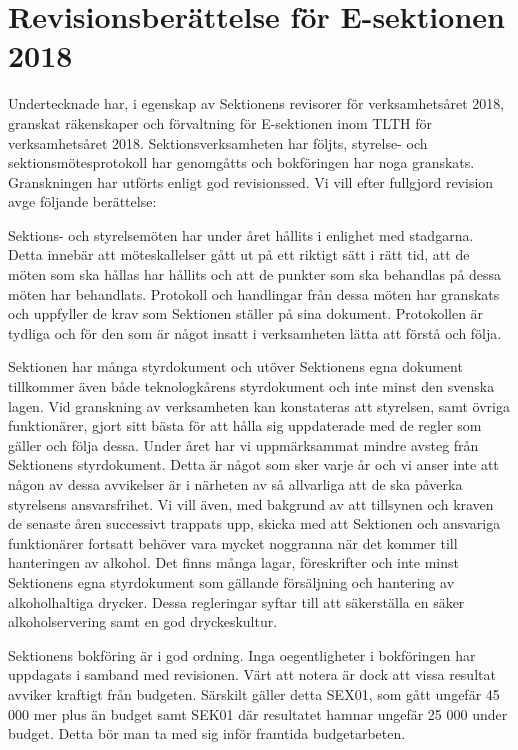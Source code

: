 \documentclass[../_main/handlingar.tex]{subfiles}
\begin{document}
\section{Revisionsberättelse för E-sektionen 2018}

Undertecknade har, i egenskap av Sektionens revisorer för verksamhetsåret 2018, granskat räkenskaper och förvaltning för E-sektionen inom TLTH för verksamhetsåret 2018. Sektionsverksamheten har följts, styrelse- och sektionsmötesprotokoll har genomgåtts och bokföringen har noga granskats. Granskningen har utförts enligt god revisionssed. Vi vill efter fullgjord revision avge följande berättelse: 

Sektions- och styrelsemöten har under året hållits i enlighet med stadgarna. Detta innebär att möteskallelser gått ut på ett riktigt sätt i rätt tid, att de möten som ska hållas har hållits och att de punkter som ska behandlas på dessa möten har behandlats. Protokoll och handlingar från dessa möten har granskats och uppfyller de krav som Sektionen ställer på sina dokument. Protokollen är tydliga och för den som är något insatt i verksamheten lätta att förstå och följa. 

Sektionen har många styrdokument och utöver Sektionens egna dokument tillkommer även både teknologkårens styrdokument och inte minst den svenska lagen. Vid granskning av verksamheten kan konstateras att styrelsen, samt övriga funktionärer, gjort sitt bästa för att hålla sig uppdaterade med de regler som gäller och följa dessa. Under året har vi uppmärksammat mindre avsteg från Sektionens styrdokument. Detta är något som sker varje år och vi anser inte att någon av dessa avvikelser är i närheten av så allvarliga att de ska påverka styrelsens ansvarsfrihet. Vi vill även, med bakgrund av att tillsynen och kraven de senaste åren successivt trappats upp, skicka med att Sektionen och ansvariga funktionärer fortsatt behöver vara mycket noggranna när det kommer till hanteringen av alkohol. Det finns många lagar, föreskrifter och inte minst Sektionens egna styrdokument som gällande försäljning och hantering av alkoholhaltiga drycker. Dessa regleringar syftar till att säkerställa en säker alkoholservering samt en god dryckeskultur.

Sektionens bokföring är i god ordning. Inga oegentligheter i bokföringen har uppdagats i samband med revisionen. Värt att notera är dock att vissa resultat avviker kraftigt från budgeten. Särskilt gäller detta SEX01, som gått ungefär 45 000 mer plus än budget samt SEK01 där resultatet hamnar ungefär 25 000 under budget. Detta bör man ta med sig inför framtida budgetarbeten.
\end{document}
